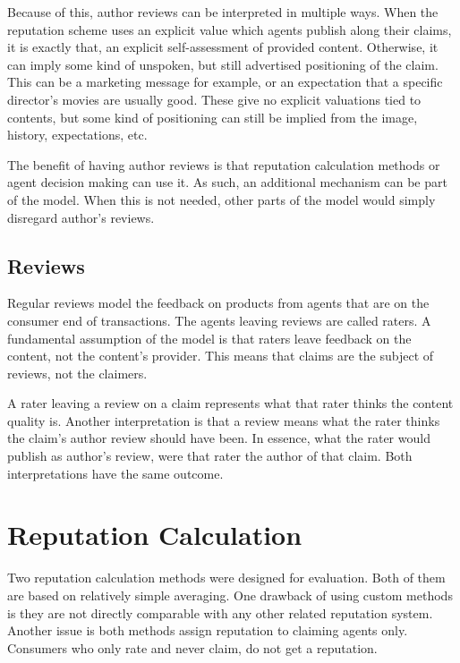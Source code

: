 \documentclass[%
    ]{\PathToTumTemplate/thesis/tum_thesis}
\begin{document}
Because of this, author reviews can be interpreted in multiple ways.
When the reputation scheme uses an explicit value which agents publish along their claims, it is exactly that, an explicit self-assessment of provided content.
Otherwise, it can imply some kind of unspoken, but still advertised positioning of the claim.
This can be a marketing message for example, or an expectation that a specific director's movies are usually good.
These give no explicit valuations tied to contents, but some kind of positioning can still be implied from the image, history, expectations, etc.

The benefit of having author reviews is that reputation calculation methods or agent decision making can use it.
As such, an additional mechanism can be part of the model.
When this is not needed, other parts of the model would simply disregard author's reviews.


\subsection{Reviews}\label{sec:approach_reviews}
Regular reviews model the feedback on products from agents that are on the consumer end of transactions.
The agents leaving reviews are called raters.
A fundamental assumption of the model is that raters leave feedback on the content, not the content's provider.
This means that claims are the subject of reviews, not the claimers.

A rater leaving a review on a claim represents what that rater thinks the content quality is.
Another interpretation is that a review means what the rater thinks the claim's author review should have been.
In essence, what the rater would publish as author's review, were that rater the author of that claim.
Both interpretations have the same outcome.




\section{Reputation Calculation}\label{sec:approach_reputation_calculation}
Two reputation calculation methods were designed for evaluation.
Both of them are based on relatively simple averaging.
One drawback of using custom methods is they are not directly comparable with any other related reputation system.
Another issue is both methods assign reputation to claiming agents only.
Consumers who only rate and never claim, do not get a reputation.
\end{document}
